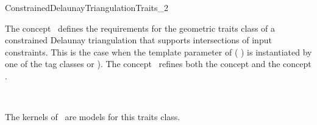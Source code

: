 

\begin{ccRefConcept}{ConstrainedDelaunayTriangulationTraits_2}


\ccDefinition
  

The concept \ccRefName\ defines the requirements for the geometric
traits class of a constrained Delaunay  triangulation
that supports intersections of input constraints.
This is the case
when the template parameter  
of ( )
is instantiated
by one of the tag classes  or
). 
The concept \ccRefName\  refines both the concept
 and the concept
.

\ccRefines
{} \\






\ccHasModels
The kernels of \cgal\ are models for this traits class.

\ccSeeAlso
{} \\
 \\
 \\






\end{ccRefConcept}


